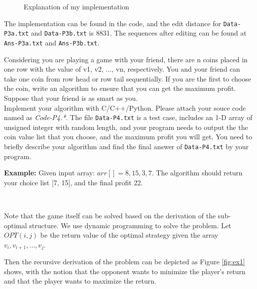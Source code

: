 \begin{exercise}
\begin{solution}
\begin{figure}
    \caption{Explanation of my implementation \label{fig:ex5}}
  \end{figure}

  The implementation can be found in the code, and the edit distance for \texttt{Data-P3a.txt} and \texttt{Data-P3b.txt} is 8831. The sequences after editing can be found at \texttt{Ans-P3a.txt} and \texttt{Ans-P3b.txt}.

  \end{solution}
  \label{ex3}
\end{exercise}



\begin{exercise}[]{Considering you are playing a game with your friend, there are n coins placed in one row with the value of v1, v2, ..., vn, respectively. You and your friend can take one coin from row head or row tail sequentially. If you are the first to choose the coin, write an algorithm to ensure that you can get the maximum profit. Suppose that your friend is as smart as you. 
    ~\\
    Implement your algorithm with C/C++/Python. Please attach your souce code named as {\color{red}\emph{Code-P4.*}}. The file \texttt{Data-P4.txt} is a test case, includes an 1-D array of unsigned integer with random length, and your program needs to output the the coin value list that you choose, and the maximum profit you will get. You need to briefly describe your algorithm and find the final answer of \texttt{Data-P4.txt} by your program.
    
    \textbf{Example:} Given input array: $arr[]={8, 15, 3, 7}$. The algorithm should return your choice list [7, 15], and the final profit 22. 
    
}
  \begin{solution}
  \par{~}

  Note that the game itself can be solved based on the derivation of the sub-optimal structure. We use dynamic programming to solve the problem. Let $OPT(i,j)$ be the return value of the optimal strategy given the array $v_i,v_{i+1},\ldots,v_{j}$.

  Then the recursive derivation of the problem can be depicted as Figure \ref{fig:ex1} shows, with the notion that the opponent wants to minimize the player's return and that the player wants to maximize the return.


\end{solution}
\end{exercise}
